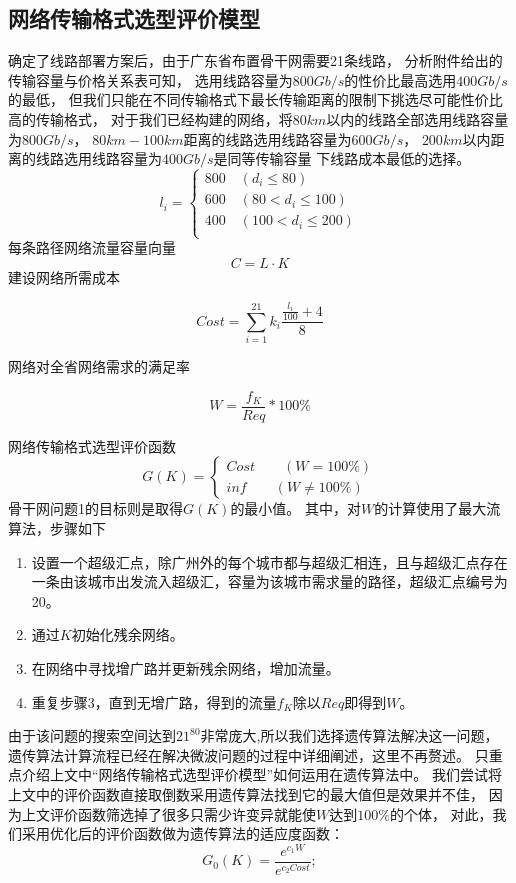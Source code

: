 \documentclass[UTF8,12pt]{ctexart}
\begin{document}
    \subsection{网络传输格式选型评价模型}\label{WLCSGS}
    确定了线路部署方案后，由于广东省布置骨干网需要21条线路，
    分析附件给出的传输容量与价格关系表可知，
    选用线路容量为$800Gb/s$的性价比最高选用$400Gb/s$的最低，
    但我们只能在不同传输格式下最长传输距离的限制下挑选尽可能性价比高的传输格式，
    对于我们已经构建的网络，将$80km$以内的线路全部选用线路容量为$800Gb/s$，
    $80km-100km$距离的线路选用线路容量为$600Gb/s$，
    $200km$以内距离的线路选用线路容量为$400Gb/s$是同等传输容量
    下线路成本最低的选择。$$l_i=\begin{cases}
        800\quad (d_i\leqslant 80) \\
        600\quad  (80<d_i\leqslant 100)\\
        400\quad  (100<d_i\leqslant 200) \\
     \end{cases} $$
     每条路径网络流量容量向量$$C=L·K$$
     建设网络所需成本
     \begin{large}
         $$Cost=\sum_{i=1}^{21}k_i\frac{\frac{l_i}{100}+4}{8}$$
     \end{large}
     网络对全省网络需求的满足率
     \begin{large}
         $$W=\frac{f_K}{Req}*100\%$$
     \end{large}
     网络传输格式选型评价函数$$G(K)=\begin{cases}
         Cost \quad \quad (W=100\%)\\
         inf  \quad \quad (W\not=100\%)
     \end{cases}
     $$
     骨干网问题1的目标则是取得$G(K)$的最小值。
     其中，对$W$的计算使用了最大流算法，步骤如下
     \begin{enumerate}
        \item 设置一个超级汇点，除广州外的每个城市都与超级汇相连，且与超级汇点存在一条由该城市出发流入超级汇，容量为该城市需求量的路径，超级汇点编号为20。
        \item 通过$K$初始化残余网络。
        \item 在网络中寻找增广路并更新残余网络，增加流量。
        \item 重复步骤3，直到无增广路，得到的流量$f_K$除以$Req$即得到$W$。
     \end{enumerate}
     
     由于该问题的搜索空间达到$21^{80}$非常庞大,所以我们选择遗传算法解决这一问题，
     遗传算法计算流程已经在解决微波问题的过程中详细阐述，这里不再赘述。
     只重点介绍上文中“网络传输格式选型评价模型”如何运用在遗传算法中。
     我们尝试将上文中的评价函数直接取倒数采用遗传算法找到它的最大值但是效果并不佳，
     因为上文评价函数筛选掉了很多只需少许变异就能使$W$达到$100\%$的个体，
     对此，我们采用优化后的评价函数做为遗传算法的适应度函数：
     $$G_0(K)=\frac{e^{c_1W}}{e^{c_2Cost}};$$
\end{document}
